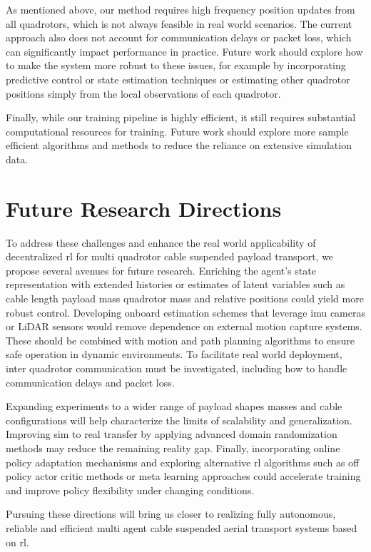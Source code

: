 As mentioned above, our method requires high frequency position updates from all quadrotors, which is not always feasible in real world scenarios. The current approach also does not account for communication delays or packet loss, which can significantly impact performance in practice. Future work should explore how to make the system more robust to these issues, for example by incorporating predictive control or state estimation techniques or estimating other quadrotor positions simply from the local observations of each quadrotor.

Finally, while our training pipeline is highly efficient, it still requires substantial computational resources for training. Future work should explore more sample efficient algorithms and methods to reduce the reliance on extensive simulation data.

\section{Future Research Directions}
To address these challenges and enhance the real world applicability of decentralized \gls{rl} for multi quadrotor cable suspended payload transport, we propose several avenues for future research. Enriching the agent's state representation with extended histories or estimates of latent variables such as cable length payload mass quadrotor mass and relative positions could yield more robust control. Developing onboard estimation schemes that leverage \gls{imu} cameras or LiDAR sensors would remove dependence on external motion capture systems. These should be combined with motion and path planning algorithms to ensure safe operation in dynamic environments. To facilitate real world deployment, inter quadrotor communication must be investigated, including how to handle communication delays and packet loss.

Expanding experiments to a wider range of payload shapes masses and cable configurations will help characterize the limits of scalability and generalization. Improving sim to real transfer by applying advanced domain randomization methods may reduce the remaining reality gap. Finally, incorporating online policy adaptation mechanisms and exploring alternative \gls{rl} algorithms such as off policy actor critic methods or meta learning approaches could accelerate training and improve policy flexibility under changing conditions.

Pursuing these directions will bring us closer to realizing fully autonomous, reliable and efficient multi agent cable suspended aerial transport systems based on \gls{rl}.